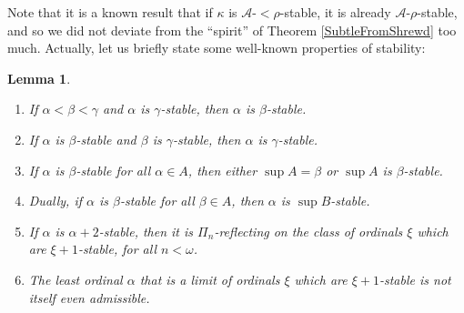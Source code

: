 \documentclass{article}
\theoremstyle{definition}
\theoremstyle{plain}
\theoremstyle{plain}
\theoremstyle{plain}
\theoremstyle{plain}
\theoremstyle{remark}
\theoremstyle{remark}
\theoremstyle{remark}
\theoremstyle{plain}
\newtheorem{lemma}[definition]{Lemma}
\theoremstyle{plain}
\theoremstyle{plain}
\begin{document}
Note that it is a known result that if $\kappa$ is $\mathcal{A}$-$< \rho$-stable, it is already $\mathcal{A}$-$\rho$-stable, and so we did not deviate from the ``spirit'' of Theorem \ref{SubtleFromShrewd} too much. Actually, let us briefly state some well-known properties of stability:

\begin{lemma}
\label{StabilityFacts}
\begin{enumerate}
    \item If $\alpha < \beta < \gamma$ and $\alpha$ is $\gamma$-stable, then $\alpha$ is $\beta$-stable.
    \item If $\alpha$ is $\beta$-stable and $\beta$ is $\gamma$-stable, then $\alpha$ is $\gamma$-stable.
    \item If $\alpha$ is $\beta$-stable for all $\alpha \in A$, then either $\sup A = \beta$ or $\sup A$ is $\beta$-stable.
    \item Dually, if $\alpha$ is $\beta$-stable for all $\beta \in A$, then $\alpha$ is $\sup B$-stable.
    \item If $\alpha$ is $\alpha+2$-stable, then it is $\Pi_n$-reflecting on the class of ordinals $\xi$ which are $\xi+1$-stable, for all $n < \omega$.
    \item The least ordinal $\alpha$ that is a limit of ordinals $\xi$ which are $\xi+1$-stable is not itself even admissible.
\end{enumerate}
\end{lemma}
\end{document}
